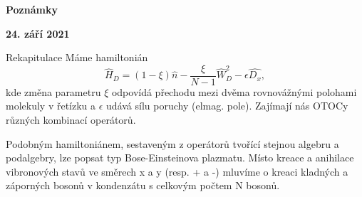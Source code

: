 \documentclass{article}
\begin{document}
\begin{center}
    \Large
    \textbf{Poznámky}
           
    \vspace{0.4cm}
    \small
    \textbf{24. září 2021}
\end{center}

\begin{section}{Rekapitulace}
Máme hamiltonián 
    $$\hat{H}_D = 
        (1 - \xi)\hat{n} - \frac{\xi}{N - 1} \hat{W}^2_D - \epsilon\hat{D_x},
    $$
kde změna parametru $\xi$ odpovídá přechodu mezi dvěma rovnovážnými polohami molekuly v řetízku a $\epsilon$
udává sílu poruchy (elmag. pole). Zajímají nás OTOCy různých kombinací operátorů. 

Podobným hamiltoniánem, sestaveným z operátorů tvořící stejnou algebru a podalgebry, lze popsat typ Bose-Einsteinova plazmatu. Místo 
kreace a anihilace vibronových stavů ve směrech x a y (resp. + a -) mluvíme o kreaci kladných a záporných bosonů v kondenzátu s celkovým
počtem N bosonů. 
\end{section}
\end{document}

